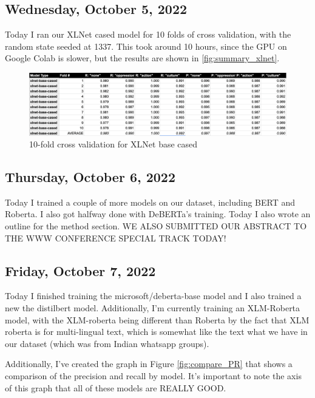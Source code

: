 \documentclass[11pt,letterpaper]{article}
\begin{document}
\subsection{Wednesday, October 5, 2022}
Today I ran our XLNet cased model for 10 folds of cross validation, with the random state seeded at 1337. This took around 10 hours, since the GPU on Google Colab is slower, but the results are shown in \ref{fig:summary_xlnet}.

\begin{figure}
    \centering
    \includegraphics[scale=0.4]{images/summary_xlnet.png}
    \caption{10-fold cross validation for XLNet base cased}
    \label{fig:fig:summary_xlnet}
\end{figure}

\subsection{Thursday, October 6, 2022}
Today I trained a couple of more models on our dataset, including BERT and Roberta. I also got halfway done with DeBERTa's training. Today I also wrote an outline for the method section. WE ALSO SUBMITTED OUR ABSTRACT TO THE WWW CONFERENCE SPECIAL TRACK TODAY!

\subsection{Friday, October 7, 2022}
Today I finished training the microsoft/deberta-base model and I also trained a new the distilbert model. Additionally, I'm currently training an XLM-Roberta model, with the XLM-roberta being different than Roberta by the fact that XLM roberta is for multi-lingual text, which is somewhat like the text what we have in our dataset (which was from Indian whatsapp groups).

Additionally, I've created the graph in Figure \ref{fig:compare_PR} that shows a comparison of the precision and recall by model. It's important to note the axis of this graph that all of these models are REALLY GOOD.
\end{document}
